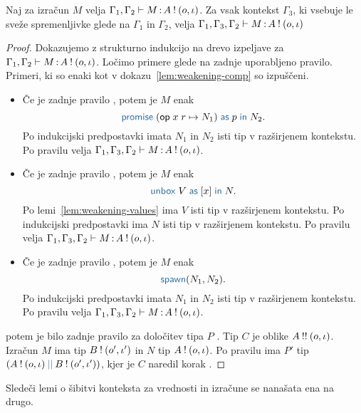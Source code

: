 \begin{lema}\label{lem:weakening-comp-2}
	Naj za izračun $M$ velja $\Gamma_1, \Gamma_2 \vdash M \mathinner{:} A \mathbin{!} (o, \iota)$. Za vsak kontekst $\Gamma_3$, ki vsebuje le sveže spremenljivke glede na $\Gamma_1$ in $\Gamma_2$, velja $\Gamma_1, \Gamma_3, \Gamma_2 \vdash M \mathinner{:} A \mathbin{!} (o, \iota)$
\end{lema}

\begin{proof}
	Dokazujemo z strukturno indukcijo na drevo izpeljave za $\Gamma_1, \Gamma_2 \vdash M \mathinner{:} A \mathbin{!} (o, \iota)$.
	Ločimo primere glede na zadnje uporabljeno pravilo.
	Primeri, ki so enaki kot v dokazu~\ref{lem:weakening-comp} so izpuščeni.
	
	\begin{itemize}
		\item Če je zadnje pravilo , potem je $M$ enak $$\tmwithrec{op}{x}{r}{N_1}{p}{N_2}.$$
		Po indukcijski predpostavki imata $N_1$ in $N_2$ isti tip v razširjenem kontekstu.
		Po pravilu  velja $\Gamma_1, \Gamma_3, \Gamma_2 \vdash M \mathinner{:} A \mathbin{!} (o, \iota)$.
		
		\item Če je zadnje pravilo , potem je $M$ enak $$\tmunbox{V}{x}{N}.$$
		Po lemi~\ref{lem:weakening-values} ima $V$ isti tip v razširjenem kontekstu.
		Po indukcijski predpostavki ima $N$ isti tip v razširjenem kontekstu.
		Po pravilu  velja $\Gamma_1, \Gamma_3, \Gamma_2 \vdash M \mathinner{:} A \mathbin{!} (o, \iota)$.
		
		\item Če je zadnje pravilo , potem je $M$ enak $$\tmspawn{N_1}{N_2}.$$
		Po indukcijski predpostavki imata $N_1$ in $N_2$ isti tip v razširjenem kontekstu.
		Po pravilu  velja $\Gamma_1, \Gamma_3, \Gamma_2 \vdash M \mathinner{:} A \mathbin{!} (o, \iota)$.
		
	\end{itemize}potem je bilo zadnje pravilo za določitev tipa $P$ . Tip $C$ je oblike $A \mathbin{!!} (o, \iota)$.
Izračun $M$ ima tip $B \mathbin{!} (o', \iota')$ in $N$ tip $A \mathbin{!} (o, \iota)$.
Po pravilu  ima $P'$ tip $\typar{\tycomp{A}{\o, \i}}{\tycomp{B}{\o', \i'}}$, kjer je $C$ naredil korak .
\end{proof}

Sledeči lemi o šibitvi konteksta za vrednosti in izračune se nanašata ena na drugo.

